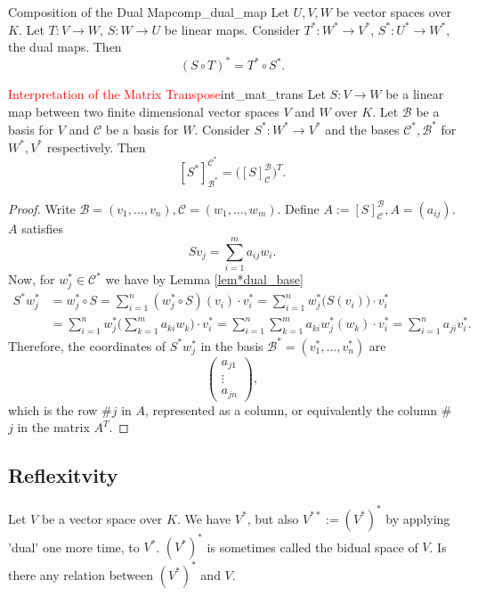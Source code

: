 \begin{proposition}{Composition of the Dual Map}{comp_dual_map}
	Let $U,V, W$ be vector spaces over $K$. Let $T:V \to W$, $S:W \to U$ be linear maps. Consider $T^*:W^* \to V^*$, $S^*:U^* \to W^*$, the dual maps. Then
	\[
		(S \circ T)^* = T^* \circ S^*.
	\]
\end{proposition}

\begin{lemma}{\textcolor{red}{Interpretation of the Matrix Transpose}}{int_mat_trans}
	Let $S:V \to W$ be a linear map between two finite dimensional vector spaces $V$ and $W$ over $K$. Let $\mathcal{B}$ be a basis for $V$ and $\mathcal{C}$ be a basis for $W$. Consider $S^*:W^* \to V^*$ and the bases $\mathcal{C}^*, \mathcal{B}^*$ for $W^*, V^*$ respectively. Then
	\[
		[S^*]^{\mathcal{C}^*}_{\mathcal{B}^*} = \big([S]^{\mathcal{B}}_{\mathcal{C}}\big)^T.
	\]
\end{lemma}

\begin{proof}
	Write $\mathcal{B} = (v_1, \hdots , v_n), \mathcal{C} = (w_1,\hdots , w_m)$. Define $A := [S]^{\mathcal{B}}_{\mathcal{C}}, A = (a_{ij})$. $A$ satisfies
	\[
		Sv_j = \sum_{i=1}^{m} a_{ij} w_i.
	\]
	Now, for $w_j^* \in \mathcal{C}^*$ we have by Lemma \ref{lem*dual_base}
	\begin{align*}
		S^*w_j^* &= w_j^* \circ S = \sum_{i=1}^{n} (w_j^* \circ S)(v_i) \cdot v_i^* = \sum_{i=1}^{n} w_j^*\big(S(v_i)\big)\cdot v_i^*\\
		&= \sum_{i=1}^{n}w_j^*\bigg(\sum_{k=1}^{m}a_{ki} w_k\bigg)\cdot v_i^* = 
		\sum_{i=1}^{n} \sum_{k=1}^{m} a_{ki} w_j^*(w_k) \cdot v_i^* =	\sum_{i=1}^{n} a_{ji} v_i^*.
	\end{align*}
	Therefore, the coordinates of $S^*w_j^*$ in the basis $\mathcal{B}^* = (v_1^*, \hdots , v_n^*)$ are
	\[
		\begin{pmatrix}
			a_{j1}\\
			\vdots \\
			a_{jn}
		\end{pmatrix},
	\]
	which is the row \#$j$ in $A$, represented as a column, or equivalently the column \#$j$ in the matrix $A^T$. \qedhere
\end{proof}

\subsection{Reflexitvity}
Let $V$ be a vector space over $K$. We have $V^*$, but also $V^{**} := (V^*)^*$ by applying 'dual' one more time, to $V^*$. $(V^*)^*$ is sometimes called the bidual space of $V$. Is there any relation between $(V^*)^*$ and $V$.

